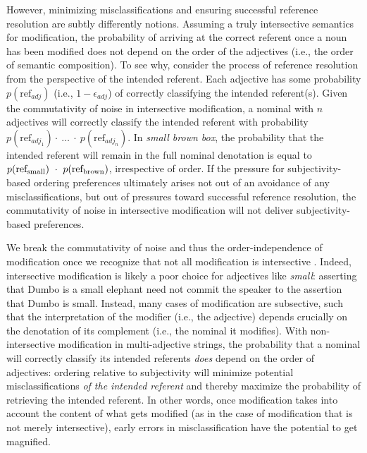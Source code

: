 \documentclass[preprint,authoryear]{elsarticle}\frenchspacing
\begin{document}
However, minimizing misclassifications and ensuring successful reference resolution are subtly differently notions. Assuming a truly intersective semantics for modification, the probability of arriving at the correct referent once a noun has been modified does not depend on the order of the adjectives (i.e., the order of semantic composition). To see why, consider the process of reference resolution from the perspective of the intended referent. Each adjective has some probability $p(\textrm{ref}_{adj})$ (i.e., $1-\epsilon_{adj}$) of correctly classifying the intended referent(s). Given the commutativity of noise in intersective modification, a nominal with $n$ adjectives will correctly classify the intended referent with probability $p(\textrm{ref}_{adj_1}) \cdot\ \ldots\ \cdot\ p(\textrm{ref}_{adj_n})$. In \emph{small brown box}, the probability that the intended referent will remain in the full nominal denotation is equal to $p(\textrm{ref}_{\footnotesize\textrm{small}}) \ \cdot\ p(\textrm{ref}_{\footnotesize\textrm{brown}})$, irrespective of order. If the pressure for subjectivity-based ordering preferences ultimately arises not out of an avoidance of any misclassifications, but out of pressures toward successful reference resolution, the commutativity of noise in intersective modification will not deliver subjectivity-based preferences.

We break the commutativity of noise and thus the order-independence of modification once we recognize that not all modification is intersective \citep{kamppartee1995,truswell2009,mcnally2016}. Indeed, intersective modification is likely a poor choice for adjectives like \emph{small}: asserting that Dumbo is a small elephant need not commit the speaker to the assertion that Dumbo is small. Instead, many cases of modification are subsective, such that the interpretation of the modifier (i.e., the adjective) depends crucially on the denotation of its complement (i.e., the nominal it modifies). With non-intersective modification in multi-adjective strings, the probability that a nominal will correctly classify its intended referents \emph{does} depend on the order of adjectives: ordering relative to subjectivity will minimize potential misclassifications \emph{of the intended referent} and thereby maximize the probability of retrieving the intended referent. In other words, once modification takes into account the content of what gets modified (as in the case of modification that is not merely intersective), early errors in misclassification have the potential to get magnified. %
\end{document}
